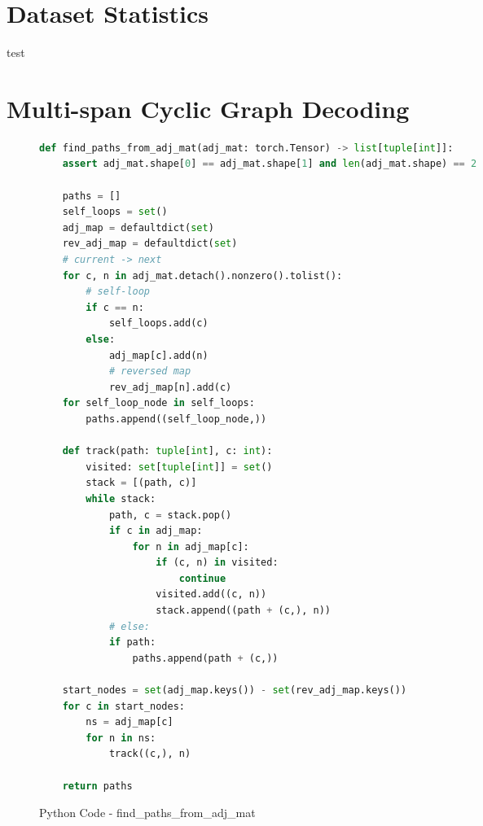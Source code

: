 \appendix
\section{Dataset Statistics}
\label{sec:appendix_data}
test

\section{Multi-span Cyclic Graph Decoding}

\begin{figure*}[htbp]
\centering
\caption{Python Code - find\_paths\_from\_adj\_mat}
\label{fig:python_code}
\begin{lstlisting}[language=Python]
def find_paths_from_adj_mat(adj_mat: torch.Tensor) -> list[tuple[int]]:
    assert adj_mat.shape[0] == adj_mat.shape[1] and len(adj_mat.shape) == 2

    paths = []
    self_loops = set()
    adj_map = defaultdict(set)
    rev_adj_map = defaultdict(set)
    # current -> next
    for c, n in adj_mat.detach().nonzero().tolist():
        # self-loop
        if c == n:
            self_loops.add(c)
        else:
            adj_map[c].add(n)
            # reversed map
            rev_adj_map[n].add(c)
    for self_loop_node in self_loops:
        paths.append((self_loop_node,))

    def track(path: tuple[int], c: int):
        visited: set[tuple[int]] = set()
        stack = [(path, c)]
        while stack:
            path, c = stack.pop()
            if c in adj_map:
                for n in adj_map[c]:
                    if (c, n) in visited:
                        continue
                    visited.add((c, n))
                    stack.append((path + (c,), n))
            # else:
            if path:
                paths.append(path + (c,))

    start_nodes = set(adj_map.keys()) - set(rev_adj_map.keys())
    for c in start_nodes:
        ns = adj_map[c]
        for n in ns:
            track((c,), n)

    return paths
\end{lstlisting}
\end{figure*}

